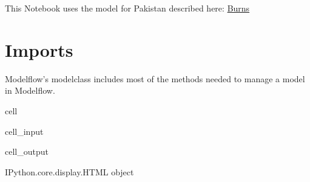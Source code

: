 \documentclass[letterpaper,10pt,english]{jupyterBook}
\begin{document}
\sphinxAtStartPar
This Notebook uses the model for Pakistan described here: \hyperlink{cite.content/litterature:id14}{Burns }


\section{Imports}
\label{\detokenize{content/howto/experiments/create_save_scenarios:imports}}
\sphinxAtStartPar
Modelflow’s modelclass includes most of the methods needed to manage a model in Modelflow.

\begin{sphinxuseclass}{cell}\begin{sphinxVerbatimInput}

\begin{sphinxuseclass}{cell_input}
\begin{sphinxVerbatim}[commandchars=\\\{\}]
    
\end{sphinxVerbatim}

\end{sphinxuseclass}\end{sphinxVerbatimInput}
\begin{sphinxVerbatimOutput}

\begin{sphinxuseclass}{cell_output}
\begin{sphinxVerbatim}[commandchars=\\\{\}]
\PYGZlt{}IPython.core.display.HTML object\PYGZgt{}
\end{sphinxVerbatim}

\end{sphinxuseclass}\end{sphinxVerbatimOutput}

\end{sphinxuseclass}
\end{document}
